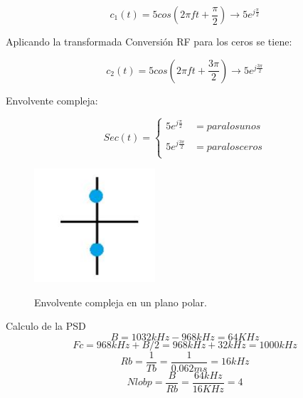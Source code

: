 \begin{equation} \label{capdos_treintacuatro}
c_{1}(t)=5cos(2\pi ft+\frac{\pi}{2})\longrightarrow 5e^{j\frac{\pi}{2}}
\end{equation}

Aplicando la transformada Conversión RF para los ceros se tiene:

\begin{equation} \label{capdos_treintacinco}
c_{2}(t)=5cos(2\pi ft+\frac{3\pi}{2})\longrightarrow 5e^{j\frac{3\pi}{2}}
\end{equation}



Envolvente compleja:

\begin{equation} \label{capdos_treintaseis}
Sec(t)= \left\{ \begin{array}{lcc}
             5e^{j\frac{\pi}{2}}   & = para los unos \\
             \\5e^{j\frac{3\pi}{2}} & = para los ceros \\
            
             \end{array}
   \right.
\end{equation}


 \begin{figure}[h!]
	\captionsetup{justification = raggedright, singlelinecheck = false}
    \caption{Envolvente compleja en un plano polar.}
    \centering
    \includegraphics[width=0.4\textwidth]{Imagenes/envolventecompleja.JPG}
    \label{fig:imagendepuntos}
\end{figure}


Calculo de la PSD 
\begin{equation*}
B= 1032kHz - 968kHz = 64 KHz 
\end{equation*} 
\begin{equation*}
Fc=968 kHz + B/2 =968 kHz +32 kHz=1000 kHz
\end{equation*}
\begin{equation*}
Rb=\frac{1}{Tb}=\frac{1}{0.062ms}=16kHz
\end{equation*}
\begin{equation*}
Nlobp=\frac{B}{Rb}=\frac{64kHz}{16KHz}=4
\end{equation*}

